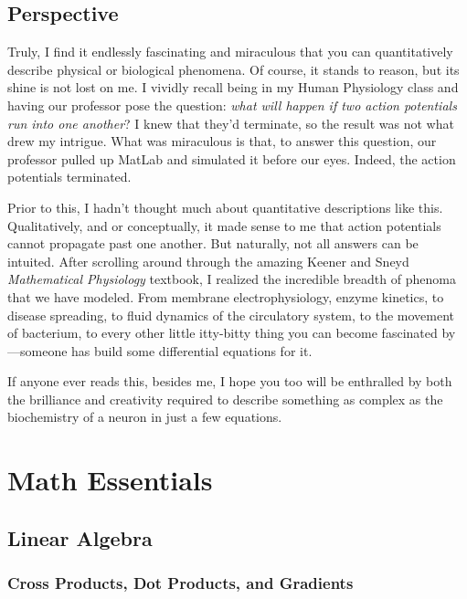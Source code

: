 \documentclass[12pt]{report}
\begin{document}
\section{Perspective}

Truly, I find it endlessly fascinating and miraculous that you can quantitatively describe physical or biological phenomena. Of course, it stands to reason, but its shine is not lost on me. I vividly recall being in my Human Physiology class and having our professor pose the question: \textit{what will happen if two action potentials run into one another}? I knew that they'd terminate, so the result was not what drew my intrigue. What was miraculous is that, to answer this question, our professor pulled up MatLab and simulated it before our eyes. Indeed, the action potentials terminated.\newline

Prior to this, I hadn't thought much about quantitative descriptions like this. Qualitatively, and or conceptually, it made sense to me that action potentials cannot propagate past one another. But naturally, not all answers can be intuited. After scrolling around through the amazing Keener and Sneyd \textit{Mathematical Physiology} textbook, I realized the incredible breadth of phenoma that we have modeled. From membrane electrophysiology, enzyme kinetics, to disease spreading, to fluid dynamics of the circulatory system, to the movement of bacterium, to every other little itty-bitty thing you can become fascinated by---someone has build some differential equations for it.\newline

If anyone ever reads this, besides me, I hope you too will be enthralled by both the brilliance and creativity required to describe something as complex as the biochemistry of a neuron in just a few equations. 



\chapter{Math Essentials}

\section{Linear Algebra}

\label{sec:linalg}

\subsection{Cross Products, Dot Products, and Gradients}
\end{document}
